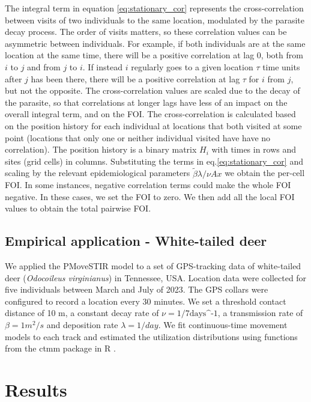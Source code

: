 \documentclass[letterpaper]{article}
\begin{document}
The integral term in equation \ref{eq:stationary_cor} represents the cross-correlation between visits of two individuals to the same location, modulated by the parasite decay process. The order of visits matters, so these correlation values can be asymmetric between individuals. 
For example, if both individuals are at the same location at the same time, there will be a positive correlation at lag 0, both from $i$ to $j$ and from $j$ to $i$. If instead $i$ regularly goes to a given location $\tau$ time units after $j$ has been there, there will be a positive correlation at lag $\tau$ for $i$ from $j$, but not the opposite. The cross-correlation values are scaled due to the decay of the parasite, so that correlations at longer lags have less of an impact on the overall integral term, and on the FOI.
The cross-correlation is calculated based on the position history for each individual at locations that both visited at some point (locations that only one or neither individual visited have have no correlation). The position history is a binary matrix $H_i$ with times in rows and sites (grid cells) in columns. 
Substituting the terms in eq.\ref{eq:stationary_cor} and scaling by the relevant epidemiological parameters $\tilde\beta\lambda/\nu Ax$ we obtain the per-cell FOI. In some instances, negative correlation terms could make the whole FOI negative. In these cases, we set the FOI to zero. We then add all the local FOI values to obtain the total pairwise FOI.

\subsection*{Empirical application - White-tailed deer}
We applied the PMoveSTIR model to a set of GPS-tracking data of white-tailed deer (\emph{Odocoileus virginianus}) in Tennessee, USA.
Location data were collected for five individuals between March and July of 2023. The GPS collars were configured to record a location every 30 minutes.
We set a threshold contact distance of 10 m, a constant decay rate of $\nu=1/7\text{days^-1}$, a transmission rate of $\beta=1 m^2/s$ and deposition rate $\lambda=1/day$.
We fit continuous-time movement models to each track and estimated the utilization distributions using functions from the ctmm package in R \citep{Calabrese2016}. 

\section*{Results}
\end{document}
